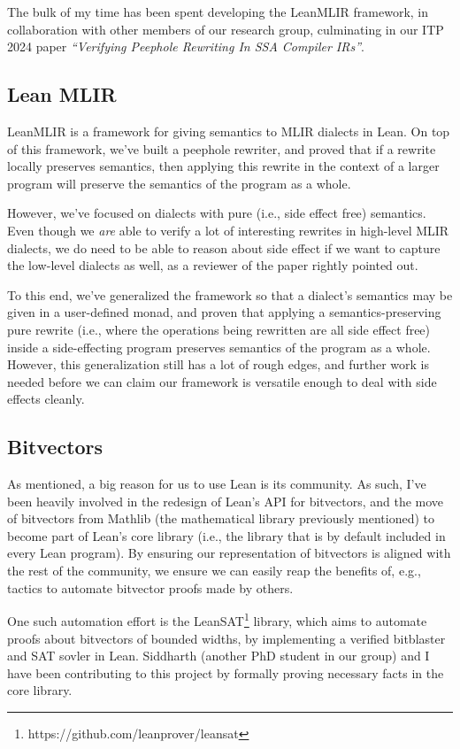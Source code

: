 \documentclass[a4paper]{scrartcl}
\begin{document}
The bulk of my time has been spent developing the LeanMLIR framework, 
in collaboration with other members of our research group, 
culminating in our ITP 2024 paper \emph{``Verifying Peephole Rewriting In SSA
Compiler IRs''}.


\subsection{Lean MLIR}\label{lean-mlir}

LeanMLIR is a framework for giving semantics to MLIR dialects in Lean.
On top of this framework, we've built a peephole rewriter, and proved
that if a rewrite locally preserves semantics, then applying this
rewrite in the context of a larger program will preserve the semantics
of the program as a whole.

However, we've focused on dialects with pure (i.e., side effect free)
semantics. Even though we \emph{are} able to verify a lot of interesting
rewrites in high-level MLIR dialects, we do need to be able to reason
about side effect if we want to capture the low-level dialects as well,
as a reviewer of the paper rightly pointed out.

To this end, we've generalized the framework so that a dialect's
semantics may be given in a user-defined monad, and proven that applying
a semantics-preserving pure rewrite (i.e., where the operations being
rewritten are all side effect free) inside a side-effecting program
preserves semantics of the program as a whole. However, this
generalization still has a lot of rough edges, and further work is
needed before we can claim our framework is versatile enough to deal
with side effects cleanly.


\subsection{Bitvectors}\label{bitvectors}

As mentioned, a big reason for us to use Lean is its community. As
such, I've been heavily involved in the redesign of Lean's API for
bitvectors, and the move of bitvectors from Mathlib (the mathematical
library previously mentioned) to become part of Lean's core library
(i.e., the library that is by default included in every Lean program).
By ensuring our representation of bitvectors is aligned with the rest of
the community, we ensure we can easily reap the benefits of, e.g.,
tactics to automate bitvector proofs made by others.

One such automation effort is the LeanSAT\footnote{https://github.com/leanprover/leansat}
library, which aims to automate proofs about bitvectors of bounded
widths, by implementing a verified bitblaster and SAT sovler in Lean.
Siddharth (another PhD student in our group) and I have been
contributing to this project by formally proving necessary facts in the
core library.
\end{document}
